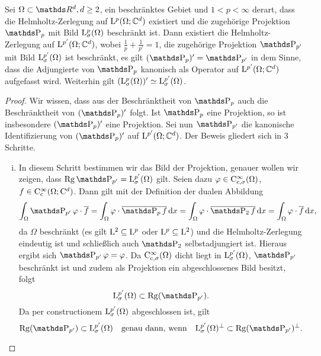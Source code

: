 \begin{prop}
  Sei $\Omega \subset \R^d, d\geq 2$, ein beschränktes Gebiet und $1< p< \infty$ derart, dass die Helmholtz-Zerlegung auf $\mathrm{L}^p(\Omega; \mathbb{C}^d)$ existiert und die zugehörige Projektion $\PP_p$ mit Bild $\mathrm{L}^p_\sigma(\Omega)$ beschränkt ist.
  Dann existiert die Helmholtz-Zerlegung auf $\mathrm{L}^{p'}(\Omega; \mathbb{C}^d)$, wobei $\frac{1}{p} + \frac{1}{p'} = 1$, die zugehörige Projektion $\PP_{p'}$ mit Bild $\mathrm{L}^{p'}_\sigma(\Omega)$ ist beschränkt, es gilt $(\PP_p)' = \PP_{p'}$ in dem Sinne, dass die Adjungierte von $\PP_p$ kanonisch als Operator auf $\mathrm{L}^{p'}(\Omega; \mathbb{C}^d)$ aufgefasst wird.
  Weiterhin gilt $(\mathrm{L}_\sigma^p(\Omega))' \simeq \mathrm{L}_\sigma^{p'}(\Omega)$.
\end{prop}

\begin{proof}
  Wir wissen, dass aus der Beschränktheit von $\PP_p$ auch die Beschränktheit von $(\PP_p)'$ folgt.
  Ist $\PP_p$ eine Projektion, so ist insbesondere $(\PP_p)'$ eine Projektion.
  Sei nun $\PP_{p'}$ die kanonische Identifizierung von $(\PP_p)'$ auf $\mathrm{L}^{p'}(\Omega; \mathbb{C}^d)$.
  Der Beweis gliedert sich in 3 Schritte.
  \begin{enumerate}[(i)]
    \item In diesem Schritt bestimmen wir das Bild der Projektion, genauer wollen wir zeigen, dass $\Rg \PP_{p'} = \Ell_\sigma^{p'}(\Omega)$ gilt.
      Seien dazu $\varphi \in \mathrm{C}_{\mathrm{c}, \sigma}^\infty(\Omega)$, $f \in \mathrm{C}_{\mathrm{c}}^\infty(\Omega; \mathrm{C}^d)$.
  Dann gilt mit der Definition der dualen Abbildung
  \begin{align*}
    \int_\Omega \PP_{p'}\varphi \cdot \overline f 
    = \int_\Omega \varphi \cdot \overline{\PP_p f} \d x  
    = \int_\Omega \varphi \cdot \overline{\PP_2 f} \d x 
    = \int_\Omega \varphi \cdot \overline{f} \d x,
  \end{align*}
      da $\Omega$ beschränkt (es gilt $\mathrm{L}^2 \subseteq \mathrm{L}^p$ oder $\mathrm{L}^p \subseteq \mathrm{L}^2$) und die Helmholtz-Zerlegung eindeutig ist und schließlich auch $\PP_2$ selbstadjungiert ist.
  Hieraus ergibt sich $\PP_{p'} \varphi = \varphi$.
  Da $\mathrm{C}_{\mathrm{c}, \sigma}^\infty(\Omega)$ dicht liegt in $\mathrm{L}^{p'}_\sigma(\Omega)$, $\PP_{p'}$ beschränkt ist und zudem als Projektion ein abgeschlossenes Bild besitzt, folgt
  $$
  \Ell^{p'}_\sigma(\Omega) \subset \Rg(\PP_{p'}).
  $$
  Da per constructionem $\mathrm{L}_\sigma^{p'}(\Omega)$ abgeschlossen ist, gilt
  $$
  \Rg(\PP_{p'}) \subset \Ell_\sigma^{p'}(\Omega)\quad \text{genau dann, wenn}\quad \Ell_\sigma^{p'}(\Omega)^\perp \subset \Rg(\PP_{p'})^\perp.
$$
\end{enumerate}
\end{proof}

